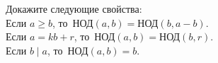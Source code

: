 





\setcounter{jeolmsubproblem}{0}%
Докажите следующие свойства:
\\
\sp
Если $a \geq b$, то~$\text{НОД}(a, b) = \text{НОД}(b, a - b)$.
\\
\sp
Если $a = k b + r$, то~$\text{НОД}(a, b) = \text{НОД}(b, r)$.
\\
\sp
Если $b \mid a$, то~$\text{НОД}(a,b) = b$.

